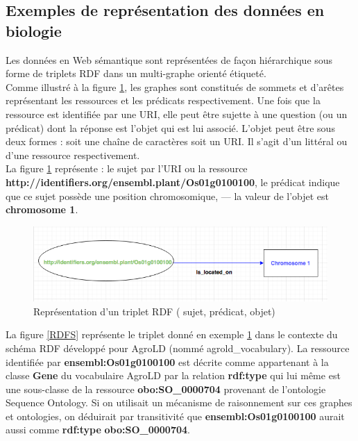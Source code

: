 \subsection{Exemples de représentation des données en biologie}

Les données en Web sémantique sont représentées de façon hiérarchique sous forme de triplets RDF dans un multi-graphe orienté étiqueté.\\

Comme illustré à la figure  \ref{triplet}, les graphes sont constitués de sommets et d’arêtes représentant les ressources et les prédicats respectivement. Une fois que la ressource est identifiée par une URI, elle peut être sujette à une question (ou un prédicat) dont la réponse est l’objet qui est lui associé. L’objet peut être sous deux formes : soit une chaîne de caractères soit un URI. Il s’agit d’un littéral ou d’une ressource respectivement.\\

La figure \ref{triplet} représente :
le sujet par l’URI ou la ressource \\ 
\textbf{http://identifiers.org/ensembl.plant/Os01g0100100},
le prédicat indique que ce sujet possède une position chromosomique, — la valeur de l’objet est \textbf{chromosome 1}.

\begin{figure}[!ht]
\begin{center}
	\includegraphics[width=1\textwidth]{Figures/rdf-example.png}
\end{center}
\caption{ Représentation d'un triplet RDF ( {\color{green}sujet}, prédicat, {\color{blue}objet})}
\label{triplet}
\end{figure}


La figure \ref{RDFS} représente le triplet donné en exemple \ref{triplet} dans le contexte du schéma RDF développé pour AgroLD (nommé agrold\_vocabulary). La ressource identifiée par \textbf{ensembl:Os01g0100100} est décrite comme appartenant à la classe \textbf{Gene} du vocabulaire AgroLD par la relation \textbf{rdf:type} qui lui même est une sous-classe de la ressource \textbf{obo:SO\_0000704} provenant de l'ontologie Sequence Ontology. Si on utilisait un mécanisme de raisonnement sur ces graphes et ontologies, on déduirait par transitivité que \textbf{ensembl:Os01g0100100} aurait aussi comme \textbf{rdf:type} \textbf{obo:SO\_0000704}.\\

